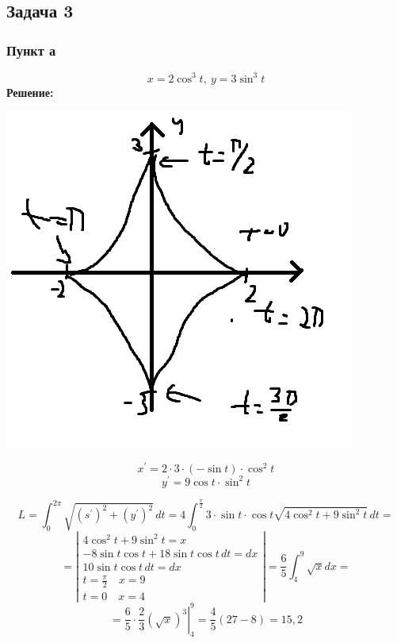 \subsection*{Задача 3}
\subsubsection*{Пункт а}
$$x=2\cos^3 t, ~ y = 3\sin^3 t$$
\textbf{Решение:} \\
\begin{minipage}{0.3\textwidth}
\includegraphics[width=\linewidth]{pics/pic3.png}
\end{minipage}
\hfill
\begin{minipage}{0.6\textwidth}\raggedleft
$$
x^{\prime} = 2 \cdot 3 \cdot (-\sin t) \cdot \cos^2 t
$$
$$
y^{\prime} = 9 \cos t \cdot \sin ^2 t
$$
\end{minipage}

$$
L = \int^{2\pi}_0 \sqrt{(s^{\prime})^2 + (y^{\prime})^2} \, d t= 4 \int^{\frac{\pi}{2}}_0 3 \cdot \sin t \cdot \cos t \sqrt{4 \cos^2 t + 9 \sin ^2 t} \, dt = 
$$
$$
= 
\left|
\begin{array}{l}
4 \cos^2 t + 9 \sin^2 t = x \\
-8\sin t \cos t + 18 \sin t \cos t \, dt = dx \\
10 \sin t \cos t \, d t=d x \\
t=\frac{\pi}{2} \quad x=9 \\
t=0 \quad x=4
\end{array} \right| =\frac{6}{5} \int_4^9 \sqrt{x} d x=
$$
$$
=\left.\frac{6}{5} \cdot \frac{2}{3}(\sqrt{x})^3\right|_4 ^9
 =\frac{4}{5}(27-8)=15,2 
$$

